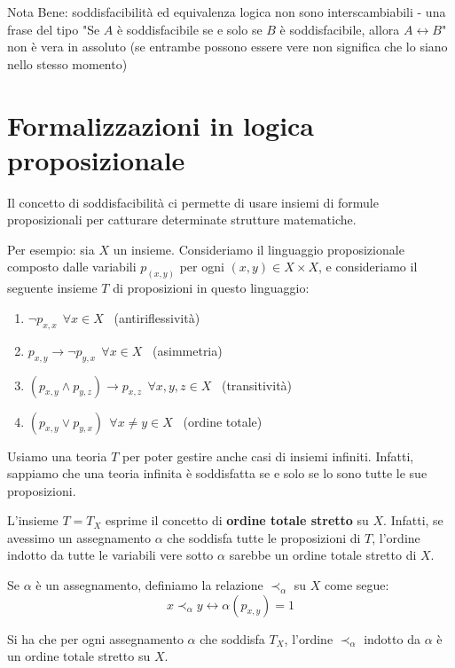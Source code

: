 \documentclass[a4paper,11pt]{report}
\begin{document}
{\color{gray}Nota Bene: soddisfacibilità ed equivalenza logica non sono interscambiabili - una frase del tipo "Se \( A \) è soddisfacibile se e solo se \( B \) è soddisfacibile, allora \( A \leftrightarrow B \)" non è vera in assoluto (se entrambe possono essere vere non significa che lo siano nello stesso momento)}

\section{Formalizzazioni in logica proposizionale}

Il concetto di soddisfacibilità ci permette di usare insiemi di formule proposizionali per catturare determinate strutture matematiche.

Per esempio: sia \( X \) un insieme. Consideriamo il linguaggio proposizionale composto dalle variabili \(p_{(x, y)}  \) per ogni \( (x,y) \in X \times X\), e consideriamo il seguente insieme \( T \) di proposizioni in questo linguaggio:

\begin{enumerate}
    \item \( \neg p_{x,x} \ \ \forall x \in X\) \ {\color{gray}(antiriflessività)}
    \item \( p_{x, y} \to \neg p_{y,x} \ \   \forall x \in X\) \ {\color{gray}(asimmetria)}
    \item \( (p_{x, y} \land p_{y, z}) \to p_{x, z} \ \ \forall x, y, z \in X\) \ {\color{gray}(transitività)}
\item \( (p_{x, y} \lor p_{y, x}) \  \ \forall x \neq  y \in X\) \ {\color{gray}(ordine totale)}
\end{enumerate}

Usiamo una teoria \( T \) per poter gestire anche casi di insiemi infiniti. Infatti, sappiamo che una teoria infinita è soddisfatta se e solo se lo sono tutte le sue proposizioni.

L'insieme \( T = T_X \) esprime il concetto di \textbf{ordine totale stretto} su \( X \). Infatti, se avessimo un assegnamento \( \alpha \) che soddisfa tutte le proposizioni di \( T \), l'ordine indotto da tutte le variabili vere sotto \( \alpha \) sarebbe un ordine totale stretto di \( X  \).

Se \( \alpha \) è un assegnamento, definiamo la relazione \( \prec_{\alpha} \) su \( X \) come segue:
\[ x \prec_\alpha y \leftrightarrow \alpha(p_{x,y})=1 \]

Si ha che per ogni assegnamento \( \alpha \) che soddisfa \( T_X \), l'ordine \( \prec_\alpha \) indotto da \( \alpha \) è un ordine totale stretto su \( X \).
\end{document}
